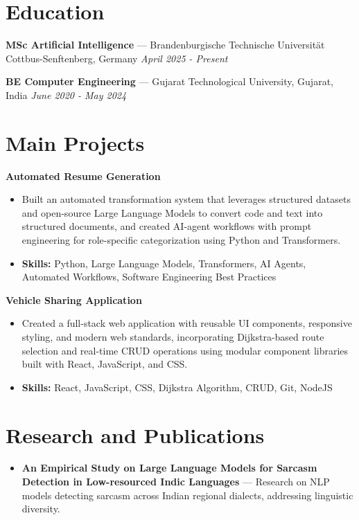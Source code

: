 \documentclass[a4paper,10pt]{article}
\begin{document}
\section*{Education}
\textbf{MSc Artificial Intelligence} — Brandenburgische Technische Universität Cottbus-Senftenberg, Germany \hfill \textit{April 2025 - Present}\par
\vspace{1.5pt}
\textbf{BE Computer Engineering} — Gujarat Technological University, Gujarat, India \hfill \textit{June 2020 - May 2024}\par

\section*{Main Projects}
\textbf{Automated Resume Generation}\par
\vspace{1pt}
\begin{itemize}
  \item Built an automated transformation system that leverages structured datasets and open-source Large Language Models to convert code and text into structured documents, and created AI-agent workflows with prompt engineering for role-specific categorization using Python and Transformers.
  \item \textbf{Skills:} Python, Large Language Models, Transformers, AI Agents, Automated Workflows, Software Engineering Best Practices
\end{itemize}
\vspace{3pt}
\textbf{Vehicle Sharing Application}\par
\vspace{1pt}
\begin{itemize}
  \item Created a full-stack web application with reusable UI components, responsive styling, and modern web standards, incorporating Dijkstra-based route selection and real-time CRUD operations using modular component libraries built with React, JavaScript, and CSS.
  \item \textbf{Skills:} React, JavaScript, CSS, Dijkstra Algorithm, CRUD, Git, NodeJS
\end{itemize}

\section*{Research and Publications}
\begin{itemize}
\item \textbf{An Empirical Study on Large Language Models for Sarcasm Detection in Low-resourced Indic Languages} — Research on NLP models detecting sarcasm across Indian regional dialects, addressing linguistic diversity.
\end{itemize}
\end{document}
